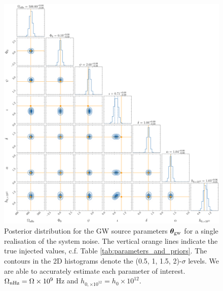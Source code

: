 \documentclass[fleqn,usenatbib,useAMS]{mnras}
\begin{document}
 

 
 
\begin{figure}
	\includegraphics[width=\textwidth, height =\textwidth ]{images/representative_example_v2_GW}
	\caption{Posterior distribution for the GW source parameters $\boldsymbol{\theta}_{\rm gw}$ for a single realisation of the system noise. The vertical orange lines indicate the true injected values, c.f. Table \ref{tab:parameters_and_priors}. The contours in the 2D histograms denote the (0.5, 1, 1.5, 2)-$\sigma$ levels. We are able to accurately estimate each parameter of interest. $\Omega_{\rm nHz} = \Omega \times 10^{9}$ Hz and $h_{0, \times 10^{12}} = h_0 \times 10^{12}$.}
	\label{fig:corner_plot_1}
\end{figure}

%	
\end{document}
